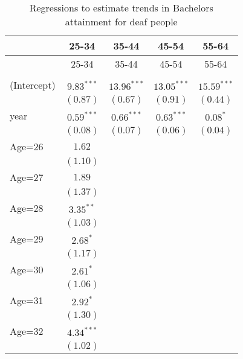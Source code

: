 \documentclass[fullpage]{paper}
\begin{document}
\begin{center}
\begin{longtable}{l c c c c }
\hline
 & 25-34 & 35-44 & 45-54 & 55-64 \\
\hline
\endfirsthead
\hline
 & 25-34 & 35-44 & 45-54 & 55-64 \\
\hline
\endhead
\hline
\endfoot
\hline
\multicolumn{5}{l}{\scriptsize{$^{***}p<0.001$, $^{**}p<0.01$, $^*p<0.05$}}\\
\caption{Regressions to estimate trends in Bachelors attainment for deaf people}
\label{table:coefficients}
\endlastfoot
(Intercept) & $9.83^{***}$ & $13.96^{***}$ & $13.05^{***}$ & $15.59^{***}$ \\
            & $(0.87)$     & $(0.67)$      & $(0.91)$      & $(0.44)$      \\
year        & $0.59^{***}$ & $0.66^{***}$  & $0.63^{***}$  & $0.08^{*}$    \\
            & $(0.08)$     & $(0.07)$      & $(0.06)$      & $(0.04)$      \\
Age=26      & $1.62$       &               &               &               \\
            & $(1.10)$     &               &               &               \\
Age=27      & $1.89$       &               &               &               \\
            & $(1.37)$     &               &               &               \\
Age=28      & $3.35^{**}$  &               &               &               \\
            & $(1.03)$     &               &               &               \\
Age=29      & $2.68^{*}$   &               &               &               \\
            & $(1.17)$     &               &               &               \\
Age=30      & $2.61^{*}$   &               &               &               \\
            & $(1.06)$     &               &               &               \\
Age=31      & $2.92^{*}$   &               &               &               \\
            & $(1.30)$     &               &               &               \\
Age=32      & $4.34^{***}$ &               &               &               \\
            & $(1.02)$     &               &               &               \\

\end{longtable}
\end{center}
\end{document}
